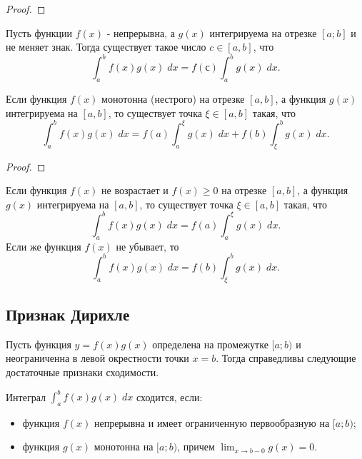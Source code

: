     \begin{proof}
    \end{proof}
    
    \begin{corollary}
    	Пусть функции $f(x)$ - непрерывна, а $g(x)$ интегрируема на отрезке $[a; b]$ и не меняет знак. Тогда существует такое число
    	$c \in [a, b]$, что
    	\[ \int_a^b f(x)g(x) \; dx = f(с) \int_a^b g(x) \; dx. \]
    \end{corollary}
    
    \begin{theorem}
    	Если функция $f(x)$ монотонна (нестрого) на отрезке $[a, b]$, а
    	функция $g(x)$ интегрируема на $[a, b]$, то существует точка
    	$\xi \in [a, b]$ такая, что
    	\[ \int_a^b f(x)g(x) \; dx = f(a) \int_a^{\xi} g(x) \; dx + f(b) \int_{\xi}^b g(x) \; dx. \]
    \end{theorem}
    
    \begin{proof}
    \end{proof}
    
    \begin{lemma}
    	Если функция $f(x)$ не возрастает и $f(x) \geqslant 0$ на отрезке $[a, b]$, а функция $g(x)$ интегрируема на $[a, b]$, то существует точка $\xi \in [a, b]$ такая, что
    	\[ \int_a^b f(x)g(x) \; dx = f(a) \int_a^{\xi} g(x) \; dx. \]
    	Если же функция $f(x)$ не убывает, то
    	\[ \int_a^b f(x)g(x) \; dx = f(b) \int_{\xi}^b g(x) \; dx. \]
    \end{lemma}
    
    \subsection{Признак Дирихле}
    
    Пусть функция $y = f(x)g(x)$ определена на промежутке $[a; b)$ и
    неограниченна в левой окрестности точки $x = b$. Тогда справедливы следующие достаточные признаки сходимости.
    
    \begin{theorem}
    	Интеграл $\int_a^b f(x)g(x) \; dx$ сходится, если:
    	\begin{itemize}
    		\item функция $f(x)$ непрерывна и имеет ограниченную
    		первообразную на $[a; b)$;
    		\item функция $g(x)$ монотонна на $[a; b)$, причем $\displaystyle \lim_{x \to b - 0} {g(x)} = 0$.
    	\end{itemize}
    \end{theorem}
    
